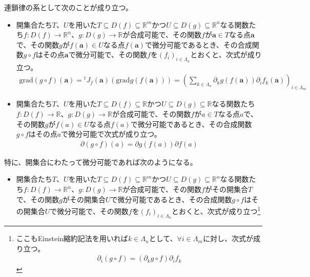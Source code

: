 \documentclass[dvipdfmx]{jsarticle}
\begin{document}
\begin{thm}[連鎖律の系]\label{4.2.6.9} 連鎖律の系として次のことが成り立つ。
\begin{itemize}
\item
  開集合たち$T$、$U$を用いた$T \subseteq D(f) \subseteq \mathbb{R}^{m}$かつ$U \subseteq D(g) \subseteq \mathbb{R}^{n}$なる関数たち$f:D(f) \rightarrow \mathbb{R}^{n}$、$g:D(g) \rightarrow \mathbb{R}$が合成可能で、その関数$f$が$\mathbf{a} \in T$なる点$\mathbf{a}$で、その関数$g$が$f\left( \mathbf{a} \right) \in Uなる点f\left( \mathbf{a} \right)$で微分可能であるとき、その合成関数$g \circ f$はその点$\mathbf{a}$で微分可能で、その関数$f$を$\left( f_{i} \right)_{i \in \varLambda_{n}}$とおくと、次式が成り立つ。
\begin{align*}
\mathrm{grad}(g \circ f)\left( \mathbf{a} \right) ={}^{t}J_{f}\left( \mathbf{a} \right)\left( \mathrm{grad}g\left( f\left( \mathbf{a} \right) \right) \right) = \left( \sum_{k \in \varLambda_{n}} {\partial_{k}g\left( f\left( \mathbf{a} \right) \right)\partial_{i}f_{k}}\left( \mathbf{a} \right) \right)_{i \in \varLambda_{m}}
\end{align*}
\item
  開集合たち$T$、$U$を用いた$T \subseteq D(f) \subseteq \mathbb{R}$かつ$U \subseteq D(g) \subseteq \mathbb{R}$なる関数たち$f:D(f) \rightarrow \mathbb{R}$、$g:D(g) \rightarrow \mathbb{R}$が合成可能で、その関数$f$が$a \in T$なる点$a$で、その関数$g$が$f(a) \in Uなる点f(a)$で微分可能であるとき、その合成関数$g \circ f$はその点$a$で微分可能で次式が成り立つ。
\begin{align*}
\partial(g \circ f)(a) = \partial g\left( f(a) \right)\partial f(a)
\end{align*}
\end{itemize}\par
特に、開集合にわたって微分可能であれば次のようになる。
\begin{itemize}
\item
  開集合たち$T$、$U$を用いた$T \subseteq D(f) \subseteq \mathbb{R}^{m}$かつ$U \subseteq D(g) \subseteq \mathbb{R}^{n}$なる関数たち$f:D(f) \rightarrow \mathbb{R}^{n}$、$g:D(g) \rightarrow \mathbb{R}$が合成可能で、その関数$f$がその開集合$T$で、その関数$g$がその開集合$U$で微分可能であるとき、その合成関数$g \circ f$はその開集合$U$で微分可能で、その関数$f$を$\left( f_{i} \right)_{i \in \varLambda_{n}}$とおくと、次式が成り立つ\footnote{ここもEinstein縮約記法を用いれば$k \in \varLambda_{n}$として、$\forall i\in \varLambda_{m}$に対し、次式が成り立つ。
  \begin{align*}
  \partial_{i}\left( g \circ f \right) = \left( \partial_{k}g \circ f \right)\partial_{i}f_{k}

\end{align*}}
\end{itemize}
\end{thm}
\end{document}
